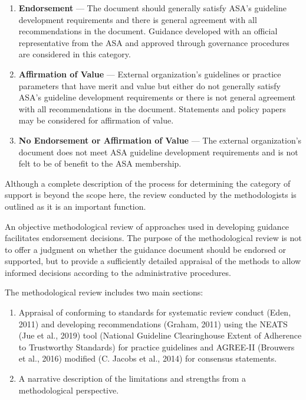 \documentclass[
  letterpaper,
  DIV=11,
  numbers=noendperiod]{scrreprt}
\providecommand{\tightlist}{%
  \setlength{\itemsep}{0pt}\setlength{\parskip}{0pt}}\usepackage{longtable,booktabs,array}
\begin{document}
\begin{enumerate}
\def\labelenumi{\arabic{enumi}.}
\item
  \textbf{Endorsement} --- The document should generally satisfy ASA's
  guideline development requirements and there is general agreement with
  all recommendations in the document. Guidance developed with an
  official representative from the ASA and approved through governance
  procedures are considered in this category.
\item
  \textbf{Affirmation of Value} --- External organization's guidelines
  or practice parameters that have merit and value but either do not
  generally satisfy ASA's guideline development requirements or there is
  not general agreement with all recommendations in the document.
  Statements and policy papers may be considered for affirmation of
  value.
\item
  \textbf{No Endorsement or Affirmation of Value} --- The external
  organization's document does not meet ASA guideline development
  requirements and is not felt to be of benefit to the ASA membership.
\end{enumerate}

Although a complete description of the process for determining the
category of support is beyond the scope here, the review conducted by
the methodologists is outlined as it is an important function.

An objective methodological review of approaches used in developing
guidance facilitates endorsement decisions. The purpose of the
methodological review is not to offer a judgment on whether the guidance
document should be endorsed or supported, but to provide a sufficiently
detailed appraisal of the methods to allow informed decisions according
to the administrative procedures.

The methodological review includes two main sections:

\begin{enumerate}
\def\labelenumi{\arabic{enumi}.}
\tightlist
\item
  Appraisal of conforming to standards for systematic review conduct
  (Eden, 2011) and developing recommendations (Graham, 2011) using the
  NEATS (Jue et al., 2019) tool (National Guideline Clearinghouse Extent
  of Adherence to Trustworthy Standards) for practice guidelines and
  AGREE-II (Brouwers et al., 2016) modified (C. Jacobs et al., 2014) for
  consensus statements.
\item
  A narrative description of the limitations and strengths from a
  methodological perspective.
\end{enumerate}
\end{document}
